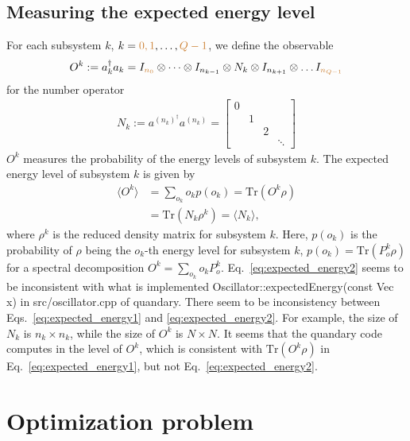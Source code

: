 \documentclass[letterpaper]{article}
\newcommand{\YC}[1]{{\textcolor{Bronze}{#1}}}
\begin{document}
\subsection{Measuring the expected energy level}\label{sec:expectedenergy}
For each subsystem $k$, $k=\YC{0,1},\dots, \YC{Q-1}$, we define the observable 
\begin{align}
  O^k := a_k^\dag a_k  = I_{\YC{n_0}} \otimes \dots \otimes I_{n_{k-1}} \otimes  N_k
  \otimes I_{n_{k+1}} \otimes \dots I_{\YC{n_{Q-1}}} 
\end{align}
for the number operator 
\begin{align}
  N_k := a^{(n_k)^\dag} a^{(n_k)} = \begin{bmatrix} 
   0 &    &    & \\
     &  1 &    &\\
     &    &  2 &\\
     &    &    & \ddots 
  \end{bmatrix}
\end{align}
$O^k$ measures the probability of the energy levels of subsystem $k$. The
expected energy level of subsystem $k$ is given by 
\begin{align}
  \langle O^k \rangle &= \sum_{o_k} o_k p(o_k)  = \mbox{Tr}(O^k\rho)
  \label{eq:expected_energy1} \\
   & = \mbox{Tr}(N_k \rho^k)  = \langle N_k\rangle \label{eq:expected_energy2},
\end{align}
where $\rho^k$ is the reduced density matrix for subsystem $k$. Here, $p(o_k)$
is the probability of $\rho$ being the $o_k$-th energy level for
subsystem $k$, $p(o_k) = \mbox{Tr}(P^k_o \rho)$ for a spectral decomposition
$O^k = \sum_{o_k} o_kP^k_o$. 
\YC{Eq.~\eqref{eq:expected_energy2} seems to be inconsistent with what is
implemented Oscillator::expectedEnergy(const Vec x) in src/oscillator.cpp of
quandary.  There seem to be inconsistency between
Eqs.~\eqref{eq:expected_energy1} and \eqref{eq:expected_energy2}.  For example,
the size of $N_k$ is $n_k \times n_k$, while the size of $O^k$ is $N \times N$.
It seems that the quandary code computes in the level of $O^k$, which is
consistent with $\mbox{Tr}(O^k\rho)$ in Eq.~\eqref{eq:expected_energy1}, but not
Eq.~\eqref{eq:expected_energy2}.}


\section{Optimization problem}
\end{document}
